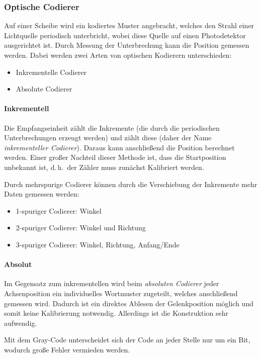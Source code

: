 \documentclass[a4paper, 11pt, accentcolor = tud3b]{tudreport}
\renewcommand{\dh}{d.\,h.~}
\begin{document}
				\subsubsection{Optische Codierer}
					Auf einer Scheibe wird ein kodiertes Muster angebracht, welches den Strahl einer Lichtquelle periodisch unterbricht, wobei diese Quelle auf einen Photodetektor ausgerichtet ist. Durch Messung der Unterbrechung kann die Position gemessen werden. Dabei werden zwei Arten von optischen Kodierern unterschieden:
					\begin{itemize}
						\item Inkrementelle Codierer
						\item Absolute Codierer
					\end{itemize}

					\paragraph{Inkrementell}
						Die Empfangseinheit zählt die Inkremente (die durch die periodischen Unterbrechungen erzeugt werden) und zählt diese (daher der Name \emph{inkrementeller Codierer}). Daraus kann anschließend die Position berechnet werden. Einer großer Nachteil dieser Methode ist, dass die Startposition unbekannt ist, \dh der Zähler muss zunächst Kalibriert werden.
						
						Durch mehrspurige Codierer können durch die Verschiebung der Inkremente mehr Daten gemessen werden:
						\begin{itemize}
							\item 1-spuriger Codierer: Winkel
							\item 2-spuriger Codierer: Winkel und Richtung
							\item 3-spuriger Codierer: Winkel, Richtung, Anfang/Ende
						\end{itemize}

					\paragraph{Absolut}
						Im Gegensatz zum inkrementellen wird beim \emph{absoluten Codierer} jeder Achsenposition ein individuelles Wortmuster zugeteilt, welches anschließend gemessen wird. Dadurch ist ein direktes Ablesen der Gelenkposition möglich und somit keine Kalibrierung notwendig. Allerdings ist die Konstruktion sehr aufwendig.
						
						Mit dem Gray-Code unterscheidet sich der Code an jeder Stelle nur um ein Bit, wodurch große Fehler vermieden werden.
\end{document}

